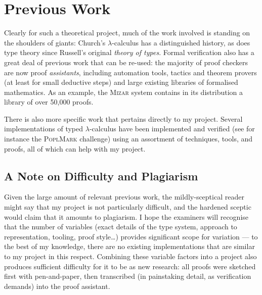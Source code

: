\section{Previous Work}
Clearly for such a theoretical project, much of the work involved is standing on the shoulders of giants: Church's \(\lambda\)-calculus has a distinguished history\cite{lambda-history}, as does type theory since Russell's original \emph{theory of types}\cite{russell}.
Formal verification also has a great deal of previous work that can be re-used: the majority of proof checkers are now proof \emph{assistants}, including automation tools, tactics and theorem provers (at least for small deductive steps) and large existing libraries of formalised mathematics.
As an example, the \textsc{Mizar} system\cite{mizar} contains in its distribution a library of over 50,000 proofs.

There is also more specific work that pertains directly to my project.
Several implementations of typed \(\lambda\)-calculus have been implemented and verified (see for instance the \textsc{PoplMark} challenge\cite{poplmark}) using an assortment of techniques, tools, and proofs, all of which can help with my project.

\subsection{A Note on Difficulty and Plagiarism}
Given the large amount of relevant previous work, the mildly-sceptical reader might say that my project is not particularly difficult, and the hardened sceptic would claim that it amounts to plagiarism.
I hope the examiners will recognise that the number of variables (exact details of the type system, approach to representation, tooling, proof style\ldots) provides significant scope for variation --- to the best of my knowledge, there are no existing implementations that are similar to my project in this respect.
Combining these variable factors into a project also produces sufficient difficulty for it to be as new research: all proofs were sketched first with pen-and-paper, then transcribed (in painstaking detail, as verification demands) into the proof assistant.
